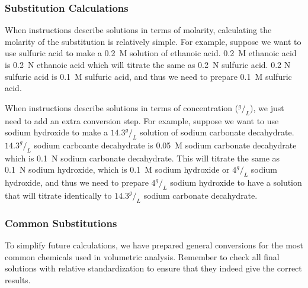 \subsubsection{Substitution Calculations}

When instructions describe solutions in terms of molarity, calculating the molarity of the substitution is relatively simple. For example, suppose we want to use sulfuric acid to make a 0.2~M solution of ethanoic acid. 0.2~M ethanoic acid is 0.2~N ethanoic acid which will titrate the same as 0.2~N sulfuric acid. 0.2 N sulfuric acid is 0.1~M sulfuric acid, and thus we need to prepare 0.1~M sulfuric acid.

When instructions describe solutions in terms of concentration ($^g/_L$), we just need to add an extra conversion step. For example, suppose we want to use sodium hydroxide to make a $14.3 ^g/_L$ solution of sodium carbonate decahydrate. $14.3 ^g/_L$ sodium carboante decahydrate is 0.05~M sodium carbonate decahydrate which is 0.1~N sodium carbonate decahydrate. This will titrate the same as 0.1~N sodium hydroxide, which is 0.1~M sodium hydroxide or $4 ^g/_L$ sodium hydroxide, and thus we need to prepare $4 ^g/_L$ sodium hydroxide to have a solution that will titrate identically to $14.3 ^g/_L$ sodium carbonate decahydrate.

\subsubsection{Common Substitutions}
\label{sec:commonsubs}
To simplify future calculations, we have prepared general conversions for the most common chemicals used in volumetric analysis. Remember to check all final solutions with relative standardization to ensure that they indeed give the correct results.

